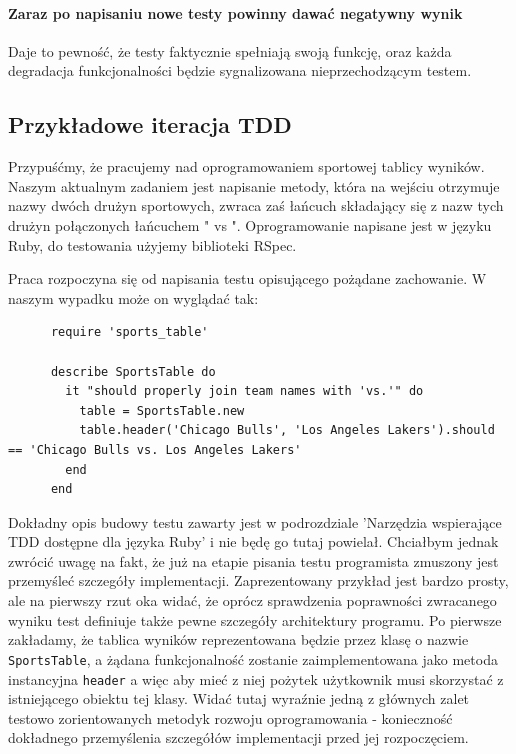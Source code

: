     \paragraph{Zaraz po napisaniu nowe testy powinny dawać negatywny wynik}
      Daje to pewność, że testy faktycznie spełniają swoją funkcję, oraz każda degradacja funkcjonalności będzie sygnalizowana nieprzechodzącym testem.
      
  \subsection{Przykładowe iteracja TDD}
    Przypuśćmy, że pracujemy nad oprogramowaniem sportowej tablicy wyników. Naszym aktualnym zadaniem jest napisanie metody, która na wejściu otrzymuje nazwy dwóch drużyn sportowych, zwraca zaś łańcuch składający się z nazw tych drużyn połączonych łańcuchem " vs ". Oprogramowanie napisane jest w języku Ruby, do testowania użyjemy biblioteki RSpec.
    
    Praca rozpoczyna się od napisania testu opisującego pożądane zachowanie. W naszym wypadku może on wyglądać tak: 
    
    \begin{verbatim}
      require 'sports_table'

      describe SportsTable do
        it "should properly join team names with 'vs.'" do
          table = SportsTable.new
          table.header('Chicago Bulls', 'Los Angeles Lakers').should == 'Chicago Bulls vs. Los Angeles Lakers'
        end
      end
    \end{verbatim}
    
    Dokładny opis budowy testu zawarty jest w podrozdziale 'Narzędzia wspierające TDD dostępne dla języka Ruby' i nie będę go tutaj powielał. Chciałbym jednak zwrócić uwagę na fakt, że już na etapie pisania testu programista zmuszony jest przemyśleć szczegóły implementacji. Zaprezentowany przykład jest bardzo prosty, ale na pierwszy rzut oka widać, że oprócz sprawdzenia poprawności zwracanego wyniku test definiuje także pewne szczegóły architektury programu. Po pierwsze zakładamy, że tablica wyników reprezentowana będzie przez klasę o nazwie \verb+SportsTable+, a żądana funkcjonalność zostanie zaimplementowana jako metoda instancyjna \verb+header+ a więc aby mieć z niej pożytek użytkownik musi skorzystać z istniejącego obiektu tej klasy. Widać tutaj wyraźnie jedną z głównych zalet testowo zorientowanych metodyk rozwoju oprogramowania - konieczność dokładnego przemyślenia szczegółów implementacji przed jej rozpoczęciem.
    
